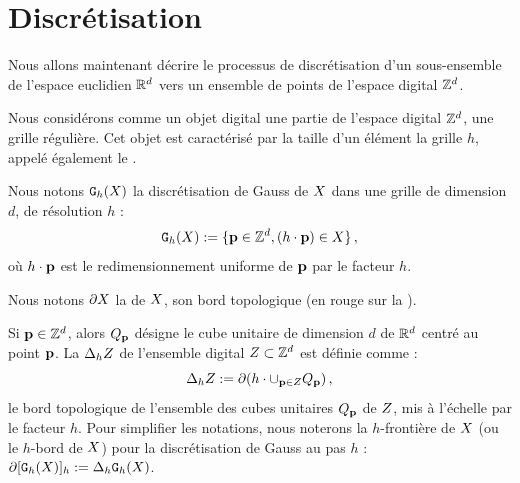 \section{Discrétisation}
\label{sec:digitization}
%
Nous allons maintenant décrire le processus de discrétisation d'un sous-ensemble
de l'espace euclidien $\mathbb{R}^d$ vers un ensemble de points de l'espace digital
$\mathbb{Z}^d$.


Nous considérons comme un objet digital une partie de l'espace digital $\mathbb{Z}^d$,
\cad une grille régulière. Cet objet est caractérisé par la taille d'un élément
la grille $h$, appelé également le .


Nous notons $\mathtt{G}_{h}(X)$ la discrétisation de Gauss de $X$ dans une grille de
dimension $d$, de résolution $h$ :
%
\begin{equation}
  \mathtt{G}_{h}(X) := \{ \mathbf{p} \in \mathbb{Z}^d, (h \cdot \mathbf{p}) \in X \} \,,
\end{equation}
%
où $h \cdot \mathbf{p}$ est le redimensionnement uniforme de $\mathbf{p}$ par le facteur $h$.


Nous notons $\partial X$ la  de $X$, \cad son bord topologique
(en rouge sur la ).


Si $\mathbf{p} \in \mathbb{Z}^d$, alors $Q_{\mathbf{p}}$ désigne le cube unitaire de dimension $d$ de
$\mathbb{R}^d$ centré au point $\mathbf{p}$. La  $\Delta_{h} Z$ de
l'ensemble digital $Z \subset \mathbb{Z}^d$ est définie comme :
%
\begin{equation}
  \Delta_{h} Z := \partial (h \cdot \cup_{\mathbf{p} \in Z} Q_{\mathbf{p}}) \,,
\end{equation}
%
\cad le bord topologique de l'ensemble des cubes unitaires $Q_{\mathbf{p}}$ de
$Z$, mis à l'échelle par le facteur $h$. Pour simplifier les notations,
nous noterons la $h$-frontière de $X$ (ou le $h$-bord de $X$) pour la
discrétisation de Gauss au pas $h$ : $\partial\lbrack \mathtt{G}_{h}(X) \rbrack_{h} := \Delta_{h}
\mathtt{G}_{h}(X)$.


